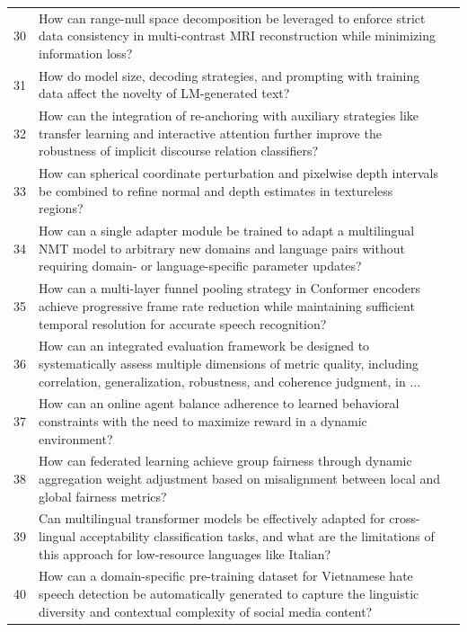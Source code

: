 \begin{longtable}{p{0.8cm}p{9cm}p{2.5cm}}
30 & How can range-null space decomposition be leveraged to enforce strict data consistency in multi-contrast MRI reconstruction while minimizing information loss? & \cite{10.1609/aaai.v38i2.27869} \\
31 & How do model size, decoding strategies, and prompting with training data affect the novelty of LM-generated text? & \cite{10.18653/v1/2024.emnlp-main.800} \\
32 & How can the integration of re-anchoring with auxiliary strategies like transfer learning and interactive attention further improve the robustness of implicit discourse relation classifiers? & \cite{10.18653/v1/2021.findings-emnlp.110} \\
33 & How can spherical coordinate perturbation and pixelwise depth intervals be combined to refine normal and depth estimates in textureless regions? & \cite{10.1609/aaai.v38i7.28512} \\
34 & How can a single adapter module be trained to adapt a multilingual NMT model to arbitrary new domains and language pairs without requiring domain- or language-specific parameter updates? & \cite{10.18653/v1/2022.findings-emnlp.315} \\
35 & How can a multi-layer funnel pooling strategy in Conformer encoders achieve progressive frame rate reduction while maintaining sufficient temporal resolution for accurate speech recognition? & \cite{10.18653/v1/2024.naacl-long.344} \\
36 & How can an integrated evaluation framework be designed to systematically assess multiple dimensions of metric quality, including correlation, generalization, robustness, and coherence judgment, in ... & \cite{10.18653/v1/2021.acl-long.500} \\
37 & How can an online agent balance adherence to learned behavioral constraints with the need to maximize reward in a dynamic environment? & \cite{10.1609/aaai.v33i01.33013} \\
38 & How can federated learning achieve group fairness through dynamic aggregation weight adjustment based on misalignment between local and global fairness metrics? & \cite{10.1609/aaai.v37i6.25911} \\
39 & Can multilingual transformer models be effectively adapted for cross-lingual acceptability classification tasks, and what are the limitations of this approach for low-resource languages like Italian? & \cite{10.18653/v1/2021.findings-emnlp.250} \\
40 & How can a domain-specific pre-training dataset for Vietnamese hate speech detection be automatically generated to capture the linguistic diversity and contextual complexity of social media content? & \cite{10.18653/v1/2024.findings-acl.355} \\

\end{longtable}
